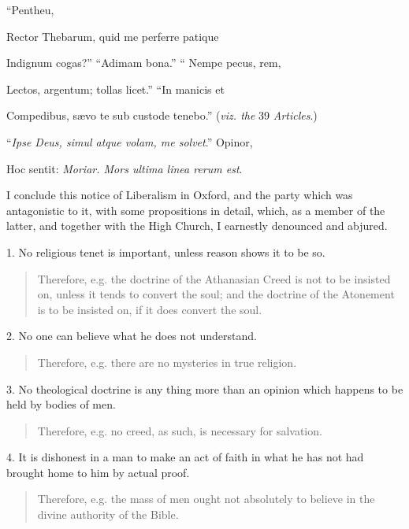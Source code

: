 ``Pentheu,

Rector Thebarum, quid me perferre patique

Indignum cogas?'' ``Adimam bona.'' `` Nempe pecus,
rem,

Lectos, argentum; tollas licet.'' ``In manicis et

Compedibus, sævo te sub custode tenebo.'' (\emph{viz. the} 39 \emph{Articles}.)

``\emph{Ipse Deus, simul atque volam, me solvet}.'' Opinor,

Hoc sentit: \emph{Moriar. Mors ultima linea rerum est}.

I conclude this notice of Liberalism in Oxford, and the party which
was antagonistic to it, with some propositions in detail, which, as a
member of the latter, and together with the High Church, I earnestly
denounced and abjured.

1. No religious tenet is important, unless reason shows it to be so.

\begin{quote}

Therefore, e.g. the doctrine of the Athanasian Creed is not to be
insisted on, unless it tends to convert the soul; and the doctrine
of the Atonement is to be insisted on, if it does convert the soul.

\end{quote}

2. No one can believe what he does not understand.

\begin{quote}

Therefore, e.g. there are no mysteries in true religion.

\end{quote}

3. No theological doctrine is any thing more than an opinion which
happens to be held by bodies of men.

\begin{quote}

Therefore, e.g. no creed, as such, is necessary for salvation.

\end{quote}

4. It is dishonest in a man to make an act of faith in what he has
not had brought home to him by actual proof.

\begin{quote}

Therefore, e.g. the mass of men ought not absolutely to believe
in the divine authority of the Bible.

\end{quote}

